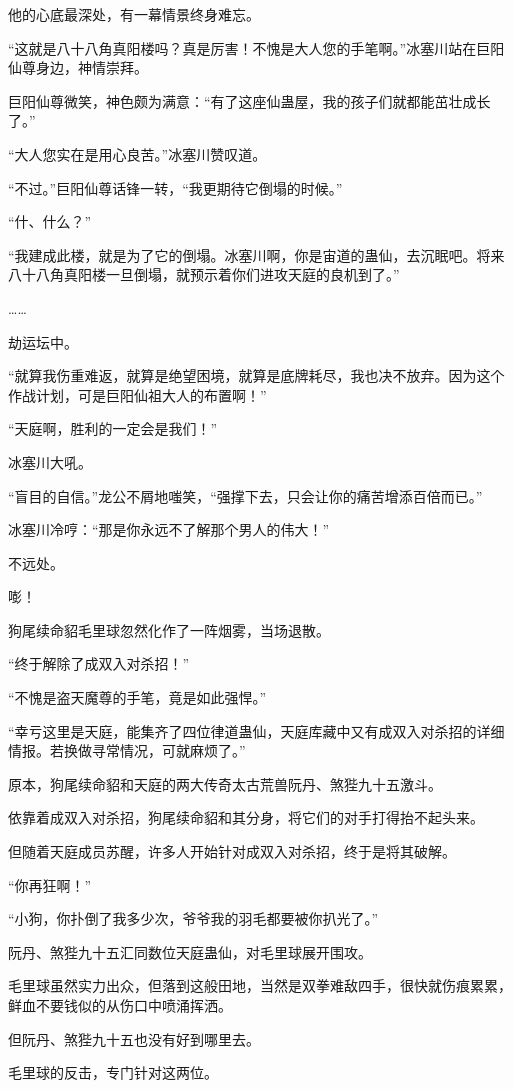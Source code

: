 \begin{this_body}
他的心底最深处，有一幕情景终身难忘。

“这就是八十八角真阳楼吗？真是厉害！不愧是大人您的手笔啊。”冰塞川站在巨阳仙尊身边，神情崇拜。

巨阳仙尊微笑，神色颇为满意：“有了这座仙蛊屋，我的孩子们就都能茁壮成长了。”

“大人您实在是用心良苦。”冰塞川赞叹道。

“不过。”巨阳仙尊话锋一转，“我更期待它倒塌的时候。”

“什、什么？”

“我建成此楼，就是为了它的倒塌。冰塞川啊，你是宙道的蛊仙，去沉眠吧。将来八十八角真阳楼一旦倒塌，就预示着你们进攻天庭的良机到了。”

……

劫运坛中。

“就算我伤重难返，就算是绝望困境，就算是底牌耗尽，我也决不放弃。因为这个作战计划，可是巨阳仙祖大人的布置啊！”

“天庭啊，胜利的一定会是我们！”

冰塞川大吼。

“盲目的自信。”龙公不屑地嗤笑，“强撑下去，只会让你的痛苦增添百倍而已。”

冰塞川冷哼：“那是你永远不了解那个男人的伟大！”

不远处。

嘭！

狗尾续命貂毛里球忽然化作了一阵烟雾，当场退散。

“终于解除了成双入对杀招！”

“不愧是盗天魔尊的手笔，竟是如此强悍。”

“幸亏这里是天庭，能集齐了四位律道蛊仙，天庭库藏中又有成双入对杀招的详细情报。若换做寻常情况，可就麻烦了。”

原本，狗尾续命貂和天庭的两大传奇太古荒兽阮丹、煞狴九十五激斗。

依靠着成双入对杀招，狗尾续命貂和其分身，将它们的对手打得抬不起头来。

但随着天庭成员苏醒，许多人开始针对成双入对杀招，终于是将其破解。

“你再狂啊！”

“小狗，你扑倒了我多少次，爷爷我的羽毛都要被你扒光了。”

阮丹、煞狴九十五汇同数位天庭蛊仙，对毛里球展开围攻。

毛里球虽然实力出众，但落到这般田地，当然是双拳难敌四手，很快就伤痕累累，鲜血不要钱似的从伤口中喷涌挥洒。

但阮丹、煞狴九十五也没有好到哪里去。

毛里球的反击，专门针对这两位。


\end{this_body}
